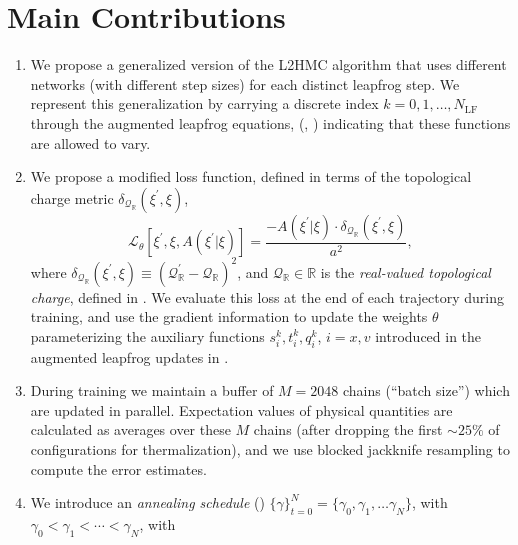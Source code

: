 \documentclass{article} %
\begin{document}
\section{\label{sec:main_contributions}Main Contributions}
\begin{enumerate}
   \item We propose a generalized version of the L2HMC algorithm that uses different networks (with different step
      sizes) for each distinct leapfrog step.
      We represent this generalization by carrying a discrete index \(k = 0, 1, \ldots, N_{\mathrm{LF}}\) through the
      augmented leapfrog equations, (, ) indicating that
      these functions are allowed to vary.
   \item We propose a modified loss function, defined in terms of the topological charge metric
      \(\delta_{\mathcal{Q}_{\mathbb{R}}}(\xi^{\prime}, \xi)\),
      \begin{equation}
         \mathcal{L}_{\theta}{\left[\xi^{\prime},\xi,A(\xi^{\prime}|\xi)\right]} =%
         \frac{-A(\xi^{\prime}|\xi)\cdot \delta_{\mathcal{Q}_{\mathbb{R}}}(\xi^{\prime},\xi)}{a^{2}},
      \end{equation}
      where \(\delta_{\mathcal{Q}_{\mathbb{R}}}(\xi^{\prime}, \xi) \equiv
      {\left(\mathcal{Q}_{\mathbb{R}}^{\prime}-\mathcal{Q}_{\mathbb{R}}\right)}^{2}\), and
      \(\mathcal{Q}_{\mathbb{R}}\in\mathbb{R}\) is the \emph{real-valued topological charge}, defined in
      .
      We evaluate this loss at the end of each trajectory during training, and use the gradient information to update
      the weights \(\theta\) parameterizing the auxiliary functions \(s^{k}_{i}, t^{k}_{i}, q^{k}_{i}\), \(i = x, v\)
      introduced in the augmented leapfrog updates in .
   \item During training we maintain a buffer of \(M = 2048\) chains (``batch size'') which are updated in parallel.
      Expectation values of physical quantities are calculated as averages over these \(M\) chains (after dropping the
      first \(\sim25\%\) of configurations for thermalization), and we use blocked jackknife resampling to compute
      the error estimates.
   \item We introduce an \emph{annealing schedule} () \({\{\gamma\}}_{t=0}^{N} =
      \{\gamma_{0}, \gamma_{1}, \ldots \gamma_{N}\}\), with \(\gamma_{0} < \gamma_{1} < \cdots < \gamma_{N}\), with

\end{enumerate}
\end{document}
